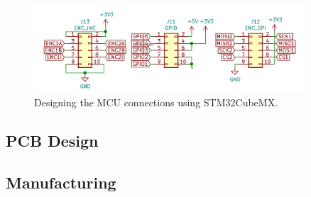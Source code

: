 \begin{figure}[H]
    \centering
    \includegraphics[width=0.9\textwidth]{obrazky/schem_enc_gpio}
    \caption{Designing the MCU connections using STM32CubeMX.}
    \label{fig:schem_enc_gpio}
\end{figure}

\subsection{PCB Design}
\label{subsec:pcb_design}

\subsection{Manufacturing}
\label{subsec:manufacturing}

